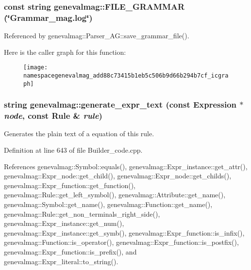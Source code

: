 \hypertarget{namespacegenevalmag_add88c73415b1eb5c506b9d66b294b7cf}{
\subsubsection[{FILE\_\-GRAMMAR}]{\setlength{\rightskip}{0pt plus 5cm}const string genevalmag::FILE\_\-GRAMMAR (\char`\"{}Grammar\_\-mag.log\char`\"{})}}
\label{namespacegenevalmag_add88c73415b1eb5c506b9d66b294b7cf}


Referenced by genevalmag::Parser\_\-AG::save\_\-grammar\_\-file().



Here is the caller graph for this function:\nopagebreak
\begin{figure}[H]
\begin{center}
\leavevmode
\texttt{[image: namespacegenevalmag\_add88c73415b1eb5c506b9d66b294b7cf\_icgraph]}
\end{center}
\end{figure}


\hypertarget{namespacegenevalmag_a5935695d2ab4f63ea670911809399ce0}{
\subsubsection[{generate\_\-expr\_\-text}]{\setlength{\rightskip}{0pt plus 5cm}string genevalmag::generate\_\-expr\_\-text (const Expression $\ast$ {\em node}, \/  const Rule \& {\em rule})}}
\label{namespacegenevalmag_a5935695d2ab4f63ea670911809399ce0}
Generates the plain text of a equation of this rule. 

Definition at line 643 of file Builder\_\-code.cpp.



References genevalmag::Symbol::equals(), genevalmag::Expr\_\-instance::get\_\-attr(), genevalmag::Expr\_\-node::get\_\-child(), genevalmag::Expr\_\-node::get\_\-childs(), genevalmag::Expr\_\-function::get\_\-function(), genevalmag::Rule::get\_\-left\_\-symbol(), genevalmag::Attribute::get\_\-name(), genevalmag::Symbol::get\_\-name(), genevalmag::Function::get\_\-name(), genevalmag::Rule::get\_\-non\_\-terminals\_\-right\_\-side(), genevalmag::Expr\_\-instance::get\_\-num(), genevalmag::Expr\_\-instance::get\_\-symb(), genevalmag::Expr\_\-function::is\_\-infix(), genevalmag::Function::is\_\-operator(), genevalmag::Expr\_\-function::is\_\-postfix(), genevalmag::Expr\_\-function::is\_\-prefix(), and genevalmag::Expr\_\-literal::to\_\-string().



